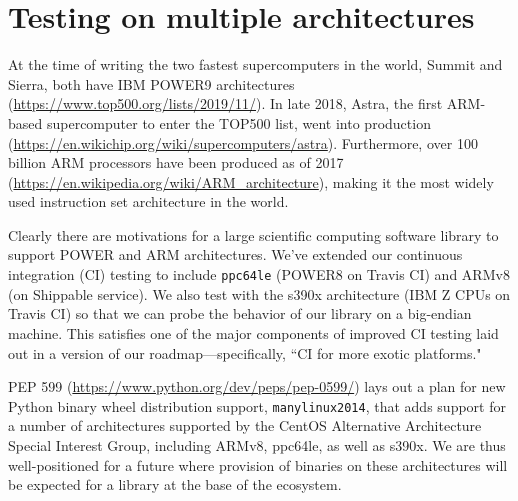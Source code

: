 \documentclass{article}
\begin{document}
\section*{Testing on multiple architectures}

At the time of writing the two fastest supercomputers in the
world, Summit and Sierra, both have IBM POWER9 architectures
(\url{https://www.top500.org/lists/2019/11/}).
In late 2018, Astra, the first ARM-based supercomputer
to enter the TOP500 list, went into production
(\url{https://en.wikichip.org/wiki/supercomputers/astra}).
Furthermore, over 100 billion ARM processors have been produced as
of 2017 (\url{https://en.wikipedia.org/wiki/ARM_architecture}),
making it the most widely used instruction set architecture
in the world.

Clearly there are motivations for a large scientific computing
software library to support POWER and ARM architectures. We've extended
our continuous integration (CI) testing to include \texttt{ppc64le}
(POWER8 on Travis CI) and ARMv8 (on Shippable service). We also test
with the s390x architecture (IBM Z CPUs on Travis CI) so that we
can probe the behavior of our library on a big-endian machine.
This satisfies one of the major components of
improved CI testing laid out in a version of our
roadmap---specifically, ``CI for more exotic
platforms."

PEP 599 (\url{https://www.python.org/dev/peps/pep-0599/})
lays out a plan for new Python binary wheel
distribution support, \texttt{manylinux2014}, that adds
support for a number of architectures supported by the CentOS
Alternative Architecture Special Interest Group, including
ARMv8, ppc64le, as well as s390x. We are thus well-positioned
for a future where provision of binaries on these architectures
will be expected for a library at the base of the ecosystem.
 
\end{document}
